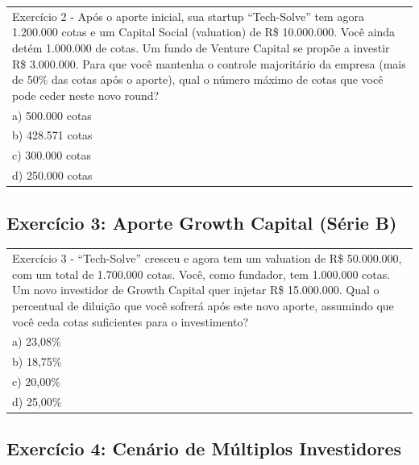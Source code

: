 \documentclass[
]{book}
\begin{document}
\begin{longtable}[]{@{}
  >{\raggedright\arraybackslash}p{}@{}}
\toprule\noalign{}
\endhead
\bottomrule\noalign{}
\endlastfoot
Exercício 2 - Após o aporte inicial, sua startup ``Tech-Solve'' tem agora 1.200.000 cotas e um Capital Social (valuation) de R\$ 10.000.000. Você ainda detém 1.000.000 de cotas. Um fundo de Venture Capital se propõe a investir R\$ 3.000.000. Para que você mantenha o controle majoritário da empresa (mais de 50\% das cotas após o aporte), qual o número máximo de cotas que você pode ceder neste novo round? \\
a) 500.000 cotas \\
b) 428.571 cotas \\
c) 300.000 cotas \\
d) 250.000 cotas \\
\end{longtable}

\subsection{\texorpdfstring{\textbf{Exercício 3:} Aporte Growth Capital (Série B)}{Exercício 3: Aporte Growth Capital (Série B)}}\label{exercuxedcio-3-aporte-growth-capital-suxe9rie-b}

\begin{longtable}[]{@{}
  >{\raggedright\arraybackslash}p{}@{}}
\toprule\noalign{}
\endhead
\bottomrule\noalign{}
\endlastfoot
Exercício 3 - ``Tech-Solve'' cresceu e agora tem um valuation de R\$ 50.000.000, com um total de 1.700.000 cotas. Você, como fundador, tem 1.000.000 cotas. Um novo investidor de Growth Capital quer injetar R\$ 15.000.000. Qual o percentual de diluição que você sofrerá após este novo aporte, assumindo que você ceda cotas suficientes para o investimento? \\
a) 23,08\% \\
b) 18,75\% \\
c) 20,00\% \\
d) 25,00\% \\
\end{longtable}

\subsection{Exercício 4: Cenário de Múltiplos Investidores}\label{exercuxedcio-4-cenuxe1rio-de-muxfaltiplos-investidores}
\end{document}
